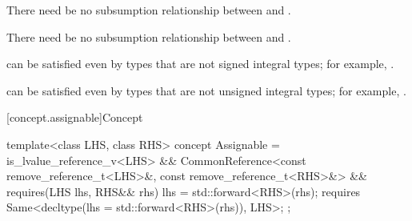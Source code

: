 \begin{itemdescr}
\pnum
There need be no subsumption relationship between
and
.

\pnum
There need be no subsumption relationship between
and
.

\pnum
\begin{note}
 can be satisfied even by types that are
not signed integral types; for example, .
\end{note}

\pnum
\begin{note}
 can be satisfied even by types that are
not unsigned integral types; for example, .
\end{note}
\end{itemdescr}

[concept.assignable]{Concept }

%
\begin{itemdecl}
template<class LHS, class RHS>
  concept Assignable =
    is_lvalue_reference_v<LHS> &&
    CommonReference<const remove_reference_t<LHS>&, const remove_reference_t<RHS>&> &&
    requires(LHS lhs, RHS&& rhs) {
      lhs = std::forward<RHS>(rhs);
      requires Same<decltype(lhs = std::forward<RHS>(rhs)), LHS>;
    };
\end{itemdecl}

